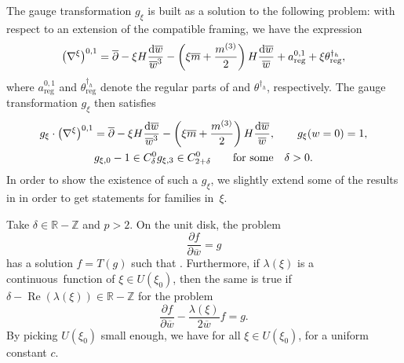 The gauge transformation $g_\xi$ is built as a solution to the following problem: with respect to an extension of the compatible framing, we have the expression
\begin{equation*}
 \bigl(\nabla^{\xi}\bigr)^{0,1}=\overline{\partial} -\xi H\frac{{\rm d}\overline{w}}{\overline{w}^3} - \left(\xi\overline{m}+ \frac{m^{(3)}}{2}\right)H\frac{{\rm d}\overline{w}}{\overline{w}} + a_{\text{reg}}^{0,1}+\xi \theta_{\text{reg}}^{\dagger_h},
\end{equation*}
where $a_{\text{reg}}^{0,1}$ and $\theta_{\text{reg}}^{\dagger_h}$ denote the regular parts of  and $\theta^{\dagger_h}$, respectively. The gauge transformation $g_{\xi}$ then satisfies
\begin{gather}
 g_{\xi}\cdot \bigl(\nabla^{\xi}\bigr)^{0,1}=\overline{\partial} -\xi H\frac{{\rm d}\overline{w}}{\overline{w}^3} - \left(\xi\overline{m}+ \frac{m^{(3)}}{2}\right)H\frac{{\rm d}\overline{w}}{\overline{w}},\qquad
 g_{\xi}(w=0)=1,\nonumber\\
 g_{\xi,0}-1\in C^0_{\delta} g_{\xi,3} \in C^0_{2+\delta} \qquad \text{for some}\quad \delta>0.\label{problem}
\end{gather}
In order to show the existence of such a $g_{\xi}$, we slightly extend some of the results in \cite[Section~7]{BB04} in order to get statements for families in~$\xi$.

\begin{Lemma} \label{BBext} Take $\delta \in \mathbb{R}-\mathbb{Z}$ and $p>2$. On the unit disk, the problem
\begin{equation}\label{1CR}
 \frac{\partial f}{\partial \overline{w}} = g
\end{equation}
has a solution $f=T(g)$ such that . Furthermore, if $\lambda(\xi)$ is a continuous~function of $\xi \in U(\xi_0)$, then the same is true if $\delta - \operatorname{Re}(\lambda(\xi)) \in \mathbb{R}-\mathbb{Z}$ for the problem%
\begin{equation}\label{2CR}
 \frac{\partial f}{\partial \overline{w}} -\frac{\lambda(\xi)}{2\overline{w}}f = g.
\end{equation}
By picking $U(\xi_0)$ small enough, we have  for all $\xi \in U(\xi_0)$, for a uniform constant $c$.
\end{Lemma}

